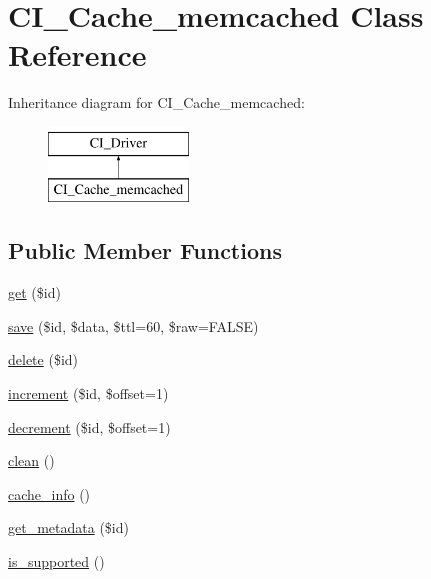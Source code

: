 \hypertarget{class_c_i___cache__memcached}{}\section{C\+I\+\_\+\+Cache\+\_\+memcached Class Reference}
\label{class_c_i___cache__memcached}
Inheritance diagram for C\+I\+\_\+\+Cache\+\_\+memcached\+:\begin{figure}[H]
\begin{center}
\leavevmode
\includegraphics[height=2.000000cm]{class_c_i___cache__memcached}
\end{center}
\end{figure}
\subsection*{Public Member Functions}
\begin{DoxyCompactItemize}
\item 
\hyperlink{class_c_i___cache__memcached_a50e3bfb586b2f42932a6a93f3fbb0828}{get} (\$id)
\item 
\hyperlink{class_c_i___cache__memcached_a472645db04a8ce4b040b789a3062a7d2}{save} (\$id, \$data, \$ttl=60, \$raw=F\+A\+L\+S\+E)
\item 
\hyperlink{class_c_i___cache__memcached_a2f8258add505482d7f00ea26493a5723}{delete} (\$id)
\item 
\hyperlink{class_c_i___cache__memcached_a2f07a4e09b57f4460d49852497d1808f}{increment} (\$id, \$offset=1)
\item 
\hyperlink{class_c_i___cache__memcached_a4eb1c2772c8efc48c411ea060dd040b7}{decrement} (\$id, \$offset=1)
\item 
\hyperlink{class_c_i___cache__memcached_adb40b812890a8bc058bf6b7a0e1a54d9}{clean} ()
\item 
\hyperlink{class_c_i___cache__memcached_acb4742926a6fa901e4f0917e1a35ef4c}{cache\+\_\+info} ()
\item 
\hyperlink{class_c_i___cache__memcached_a59635cf18e997c5141bffa05ff7622e0}{get\+\_\+metadata} (\$id)
\item 
\hyperlink{class_c_i___cache__memcached_a98c68fd153468bc148c4ed8c716859fc}{is\+\_\+supported} ()
\end{DoxyCompactItemize}
